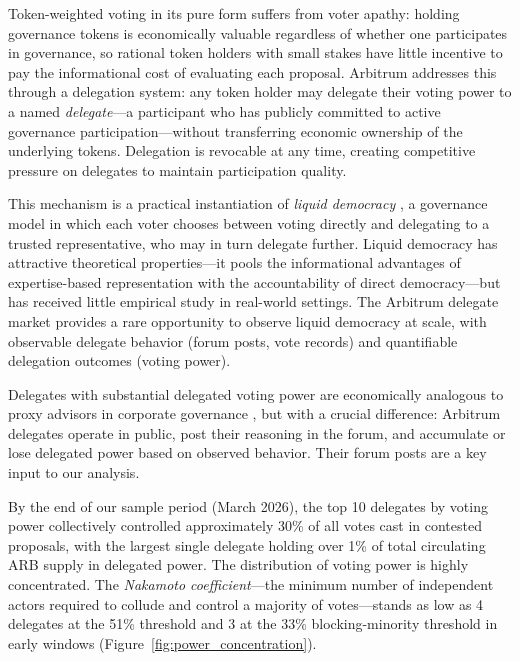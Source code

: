 \documentclass[12pt]{article}
\begin{document}
Token-weighted voting in its pure form suffers from voter apathy: holding governance
tokens is economically valuable regardless of whether one participates in governance,
so rational token holders with small stakes have little incentive to pay the
informational cost of evaluating each proposal. Arbitrum addresses this through a
delegation system: any token holder may delegate their voting power to a named
\emph{delegate}---a participant who has publicly committed to active governance
participation---without transferring economic ownership of the underlying tokens.
Delegation is revocable at any time, creating competitive pressure on delegates
to maintain participation quality.

This mechanism is a practical instantiation of \emph{liquid democracy}
\citep{blum2016}, a governance model in which each voter chooses between voting
directly and delegating to a trusted representative, who may in turn delegate
further. Liquid democracy has attractive theoretical properties---it pools the
informational advantages of expertise-based representation with the accountability
of direct democracy---but has received little empirical study in real-world settings.
The Arbitrum delegate market provides a rare opportunity to observe liquid democracy
at scale, with observable delegate behavior (forum posts, vote records) and
quantifiable delegation outcomes (voting power).

Delegates with substantial delegated voting power are economically analogous to proxy
advisors in corporate governance \citep{iliev2015}, but with a crucial difference:
Arbitrum delegates operate in public, post their reasoning in the forum, and
accumulate or lose delegated power based on observed behavior. Their forum posts are
a key input to our analysis.

By the end of our sample period (March 2026), the top 10 delegates by voting power
collectively controlled approximately 30\% of all votes cast in contested proposals,
with the largest single delegate holding over 1\% of total circulating ARB supply in delegated power.
The distribution of voting power is highly concentrated. The \emph{Nakamoto
coefficient}---the minimum number of independent actors required to collude and
control a majority of votes---stands as low as 4 delegates at the 51\% threshold
and 3 at the 33\% blocking-minority threshold in early windows
(Figure~\ref{fig:power_concentration}).
\end{document}
